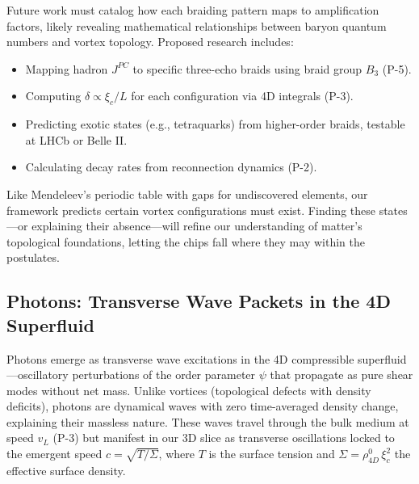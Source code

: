 Future work must catalog how each braiding pattern maps to amplification factors, likely revealing mathematical relationships between baryon quantum numbers and vortex topology. Proposed research includes:

\begin{itemize}
\item Mapping hadron $J^{PC}$ to specific three-echo braids using braid group $B_3$ (P-5).
\item Computing $\delta \propto \xi_c/L$ for each configuration via 4D integrals (P-3).
\item Predicting exotic states (e.g., tetraquarks) from higher-order braids, testable at LHCb or Belle II.
\item Calculating decay rates from reconnection dynamics (P-2).
\end{itemize}

Like Mendeleev's periodic table with gaps for undiscovered elements, our framework predicts certain vortex configurations must exist. Finding these states—or explaining their absence—will refine our understanding of matter's topological foundations, letting the chips fall where they may within the postulates.


\subsection{Photons: Transverse Wave Packets in the 4D Superfluid}

Photons emerge as transverse wave excitations in the 4D compressible superfluid---oscillatory perturbations of the order parameter $\psi$ that propagate as pure shear modes without net mass. Unlike vortices (topological defects with density deficits), photons are dynamical waves with zero time-averaged density change, explaining their massless nature. These waves travel through the bulk medium at speed $v_L$ (P-3) but manifest in our 3D slice as transverse oscillations locked to the emergent speed $c = \sqrt{T/\Sigma}$, where $T$ is the surface tension and $\Sigma = \rho_{4D}^0 \, \xi_c^2$ the effective surface density.

